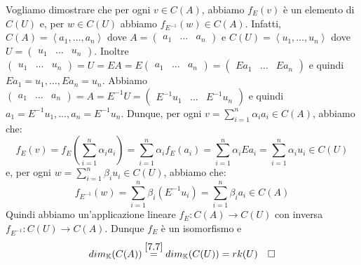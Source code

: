 \documentclass[a4paper]{article}
\theoremstyle{break}
\theoremstyle{break}
\theoremstyle{break}
\theoremstyle{break}
\begin{document}
\noindent Vogliamo dimostrare che per ogni \( v \in C(A) \), abbiamo \( f_E(v) \) è un elemento di
\( C(U) \) e, per \( w \in C(U) \) abbiamo \( f_{E^{-1}}(w) \in C(A) \). Infatti,
\( C(A) = \left<a_1, \ldots, a_n \right> \) dove \( A = \begin{pmatrix} a_1 & \ldots& a_n \end{pmatrix}  \) 
e \( C(U) = \left<u_1, \ldots, u_n \right> \) dove \( U = \begin{pmatrix} u_1 & \ldots& u_n \end{pmatrix}  \).
Inoltre \( \begin{pmatrix} u_1 & \ldots & u_n \end{pmatrix} = U = EA = E \begin{pmatrix} a_1 & \ldots & a_n \end{pmatrix} =
\begin{pmatrix} Ea_1 & \ldots & Ea_n \end{pmatrix} \) e quindi \( Ea_1 = u_1, \ldots, Ea_n = u_n \).
Abbiamo \( \begin{pmatrix} a_1 & \ldots & a_n \end{pmatrix} = A = E^{-1}U = \begin{pmatrix} 
E^{-1}u_1 & \ldots & E^{-1}u_n
\end{pmatrix}  \) e quindi \( a_1 = E^{-1}u_1, \ldots, a_n = E^{-1}u_n \). Dunque,
per ogni \( v = \sum_{i=1}^{n} \alpha_i a_i \in C(A) \), abbiamo che:
\[
f_E(v) = f_E\left( \sum_{i=1}^{n} \alpha_i a_i \right) = \sum_{i=1}^{n} \alpha_i f_E(a_i) = \sum_{i=1}^{n} \alpha_i Ea_i = \sum_{i=1}^{n} \alpha_i u_i \in C(U)
\] 
e, per ogni \( w = \sum_{i=1}^{n} \beta_i u_i \in C(U) \), abbiamo che:
\[
  f_{E^{-1}}(w) = \sum_{i=1}^{n} \beta_i (E^{-1}u_i) = \sum_{i=1}^{n} \beta_i a_i \in C(A)
\] 
Quindi abbiamo un'applicazione lineare \( f_E: C(A) \to C(U) \) con inversa \( f_{E^{-1}}: C(U) \to C(A) \).
Dunque \( f_E \) è un isomorfismo e
\[
  dim_{\mathbb{K}}(C(A)) \stackrel{\ref{7.7}}{=} dim_{\mathbb{K}}(C(U)) = rk(U) \quad \square
\] 
\end{document}
